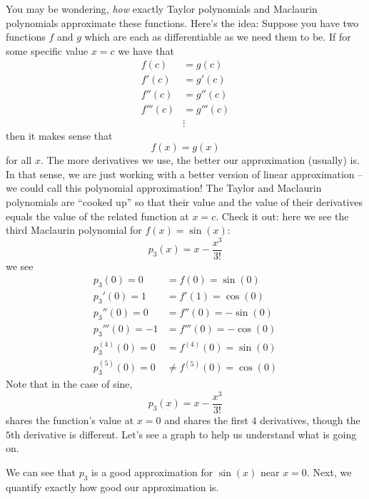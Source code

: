 \documentclass{ximera}
\begin{document}
You may be wondering, \textit{how} exactly Taylor polynomials and
Maclaurin polynomials approximate these functions. Here's the idea:
Suppose you have two functions $f$ and $g$ which are each as 
differentiable as we need them to be. If for some specific value
$x=c$ we have that
\begin{align*}
  f(c) &= g(c)\\
  f'(c) &= g'(c)\\
  f''(c) &= g''(c)\\
  f'''(c) &= g'''(c)\\
          &\vdots
\end{align*}
then it makes sense that 
\[
f(x) = g(x)
\]
for all $x$. The more derivatives we use, the better 
our approximation (usually) is.  In that sense, we are just working with a
better version of linear approximation -- we could call this polynomial approximation!  
The Taylor and Maclaurin polynomials are ``cooked up'' so
that their value and the value of their derivatives equals the value
of the related function at $x=c$.  Check it out: here we see the third
Maclaurin polynomial for $f(x) = \sin(x)$:
\[
p_3(x) = x - \frac{x^3}{3!} 
\]
we see
\begin{align*}
  p_3(0) = 0 &= f(0) = \sin(0)\\
  p_3'(0) = 1 &= f'(1) = \cos(0)\\
  p_3''(0) = 0 &= f''(0) = -\sin(0)\\
  p_3'''(0) = -1 &= f'''(0) = -\cos(0)\\
  p_3^{(4)}(0) = 0 &= f^{(4)}(0) = \sin(0)\\
  p_3^{(5)}(0) = 0 &\ne f^{(5)}(0) = \cos(0)
\end{align*}
Note that in the case of sine,
\[
p_3(x) = x - \frac{x^3}{3!} 
\]
shares the function's value at $x=0$ and shares the first $4$
derivatives, though the $5$th derivative is different. Let's see a
graph to help us understand what is going on.
      \begin{image}
      \end{image}
      We can see that $p_3$ is a good approximation for $\sin(x)$ near
      $x=0$. Next, we quantify exactly how good our approximation is.
\end{document}
